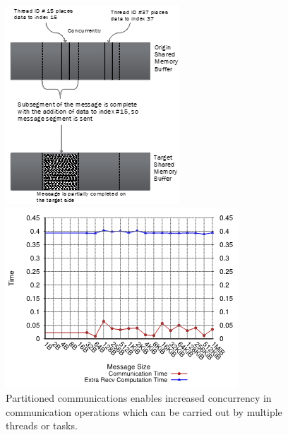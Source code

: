 \begin{figure}
\centering
\begin{minipage}[c]{0.20\textwidth}
\captionsetup{width=\textwidth,font=small,labelfont=bf} %
\caption{Partitioned communications enables increased concurrency in communication operations which can be carried out by multiple threads or tasks.}
\label{fig:partitioned-communications}
\end{minipage}
\qquad
\begin{minipage}[c]{0.20\textwidth}
\includegraphics[width=\textwidth]{projects/2.3.1-PMR/2.3.1.17-OMPI-X/partitioned-communications-partial-sends.png}
\end{minipage}
\qquad
\begin{minipage}[c]{0.33\textwidth}
\includegraphics[width=\textwidth]{projects/2.3.1-PMR/2.3.1.17-OMPI-X/partitioned-communications-early-receive.png}

\end{minipage}
\end{figure}
